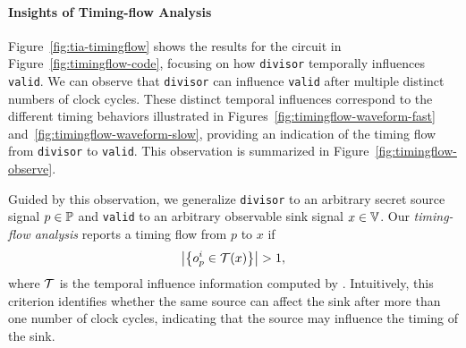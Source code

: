 \paragraph{Insights of Timing-flow Analysis}

Figure~\ref{fig:tia-timingflow} shows the \tia results for the circuit in Figure~\ref{fig:timingflow-code}, focusing on how \texttt{divisor} temporally influences \texttt{valid}.
We can observe that \texttt{divisor} can influence \texttt{valid} after multiple distinct numbers of clock cycles.
These distinct temporal influences correspond to the different timing behaviors illustrated in Figures~\ref{fig:timingflow-waveform-fast} and~\ref{fig:timingflow-waveform-slow}, providing an indication of the timing flow from \texttt{divisor} to \texttt{valid}.
This observation is summarized in Figure~\ref{fig:timingflow-observe}.

Guided by this observation, we generalize \texttt{divisor} to an arbitrary secret source signal $p\in\mathbb{P}$ and \texttt{valid} to an arbitrary observable sink signal $x\in\mathbb{V}$.
Our \emph{timing-flow analysis} reports a timing flow from $p$ to $x$ if
\[
\left|\left\{o_p^i \in \mathcal{T}(x)\right\}\right| > 1,
\]
where $\mathcal{T}$ is the temporal influence information computed by \tia.
Intuitively, this criterion identifies whether the same source can affect the sink after more than one number of clock cycles, indicating that the source may influence the timing of the sink.
